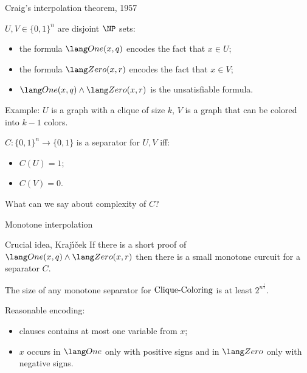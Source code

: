 \begin{frame}{Craig's interpolation theorem, 1957}

    $U, V \in \{0, 1\}^n$ are disjoint $\NP$ sets:
    \begin{itemize}
        \item the formula $\One(x, q)$ encodes the fact that $x \in U$;
        \item the formula $\Zero(x, r)$ encodes the fact that $x \in V$;
        \item $\One(x, q) \land \Zero(x, r)$ is the unsatisfiable formula.
            
    \end{itemize}

    \vspace{0.2cm}
    \pause
    Example: $U$ is a graph with a clique of size $k$, $V$ is a graph that can be colored into $k - 1$
    colors.

    \pause
    \begin{definition}
	    $C: \{0, 1\}^n \to \{0, 1\}$ is a separator for $U, V$ iff:
        \begin{itemize}
            \item $C(U) = 1$;
            \item $C(V) = 0$.
        \end{itemize}        
    \end{definition}

    \pause
	What can we say about complexity of $C$?

\end{frame}


\begin{frame}{Monotone interpolation}

    \begin{block}{Crucial idea, Kraj{\'{\i}}{\v{c}}ek}
        If there is a short proof of $\One(x, q) \land \Zero(x, r)$ then there is a small
        \alert{monotone} {\color{blue} curcuit} for a separator $C$.
    \end{block}

    \begin{theorem}
        The size of any monotone separator for $\mathrm{Clique}\text{-}\mathrm{Coloring}$ is at least $2^{n^{\frac{1}{4}}}$.
    \end{theorem}

    \pause
    Reasonable encoding:
    \begin{itemize}
        \item clauses contains at most one variable from $x$;
        \item $x$ occurs in $\One$ only with positive signs and in $\Zero$ only with negative signs.
    \end{itemize}
\end{frame}

